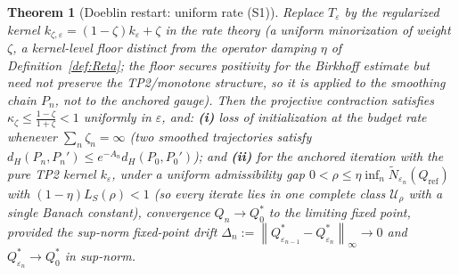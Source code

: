 \documentclass[11pt]{article}
\theoremstyle{plain}
\newtheorem{theorem}{Theorem}[section]
\theoremstyle{definition}
\theoremstyle{remark}
\newcommand{\norm}[1]{\left\lVert#1\right\rVert}
\begin{document}
\begin{theorem}[Doeblin restart: uniform rate (S1)]\label{thm:doeblin}
Replace $T_\varepsilon$ by the regularized kernel $k_{\zeta,\varepsilon}=(1-\zeta)k_\varepsilon+\zeta$ \emph{in the rate theory} (a uniform minorization of weight $\zeta$, a \emph{kernel-level} floor distinct from the operator damping $\eta$ of Definition~\ref{def:Reta}; the floor secures positivity for the Birkhoff estimate but need not preserve the TP2/monotone structure, so it is applied to the smoothing chain $P_n$, not to the anchored gauge). Then the projective contraction satisfies $\kappa_\zeta\le\frac{1-\zeta}{1+\zeta}<1$ \emph{uniformly in} $\varepsilon$, and: \textbf{(i)} loss of initialization at the budget rate whenever $\sum_n\zeta_n=\infty$ (two smoothed trajectories satisfy $d_H(P_n,P_n')\le e^{-A_n}d_H(P_0,P_0')$); and \textbf{(ii)} for the anchored iteration with the pure TP2 kernel $k_\varepsilon$, under a uniform admissibility gap $0<\rho\le\eta\inf_n\tilde N_{\varepsilon_n}(Q_{\mathrm{ref}})$ with $(1-\eta)L_S(\rho)<1$ (so every iterate lies in one complete class $\mathcal U_\rho$ with a single Banach constant), convergence $Q_n\to Q^*_0$ to the limiting fixed point, \emph{provided} the sup-norm fixed-point drift $\Delta_n:=\norm{Q^*_{\varepsilon_{n-1}}-Q^*_{\varepsilon_n}}_\infty\to0$ and $Q^*_{\varepsilon_n}\to Q^*_0$ in sup-norm.
\end{theorem}
\end{document}
